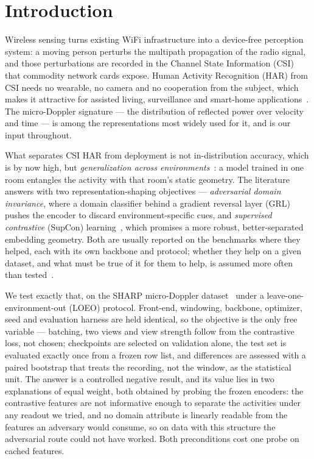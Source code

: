 
\section{Introduction}
\label{sec:introduction}

Wireless sensing turns existing WiFi infrastructure into a device-free
perception system: a moving person perturbs the multipath propagation of the
radio signal, and those perturbations are recorded in the Channel State
Information (CSI) that commodity network cards expose. Human Activity
Recognition (HAR) from CSI needs no wearable, no camera and no cooperation
from the subject, which makes it attractive for assisted living, surveillance
and smart-home applications~\cite{Wang-2019}. The micro-Doppler signature ---
the distribution of reflected power over velocity and time --- is among the
representations most widely used for it, and is our input throughout.

What separates CSI HAR from deployment is not in-distribution accuracy, which
is by now high, but \emph{generalization across environments}~\cite{Wang-2026}:
a model trained
in one room entangles the activity with that room's static geometry. The
literature answers with two representation-shaping objectives ---
\emph{adversarial domain invariance}, where a domain classifier behind a
gradient reversal layer (GRL)~\cite{Ganin-2016} pushes the encoder to discard
environment-specific cues, and \emph{supervised contrastive} (SupCon)
learning~\cite{Khosla-2020}, which promises a more robust, better-separated
embedding geometry. Both are usually reported on the benchmarks where they
helped, each
with its own backbone and protocol; whether they help on a given dataset, and
what must be true of it for them to help, is assumed more often than
tested~\cite{Gulrajani-2021}.

We test exactly that, on the SHARP micro-Doppler
dataset~\cite{Meneghello-2023} under a leave-one-environment-out (LOEO)
protocol. Front-end, windowing, backbone, optimizer, seed and
evaluation harness are held identical, so the objective is the only free
variable --- batching, two views and view strength follow from the contrastive
loss, not chosen; checkpoints are selected on validation alone, the test set is
evaluated exactly once from a frozen row list, and differences are assessed
with a paired bootstrap that treats the recording, not the window, as the
statistical unit. The answer is a controlled negative result, and its value
lies in two explanations of equal weight, both obtained by probing the frozen
encoders: the contrastive features are not informative enough to separate the
activities under any readout we tried, and no domain attribute is linearly
readable from the features an adversary would consume, so on data with this
structure the adversarial route could not have worked. Both preconditions cost
one probe on cached features.

